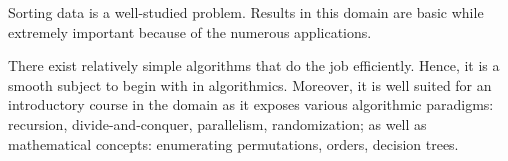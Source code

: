 \label{tree:sorting:intro}

Sorting data is a well-studied problem. Results in this domain are basic while
extremely important because of the numerous applications.

There exist relatively simple algorithms that do the job efficiently. Hence, it
is a smooth subject to begin with in algorithmics. Moreover, it is well
suited for an introductory course in the domain as it exposes various
algorithmic paradigms: recursion, divide-and-conquer, parallelism,
randomization; as well as mathematical concepts: enumerating permutations,
orders, decision trees.
